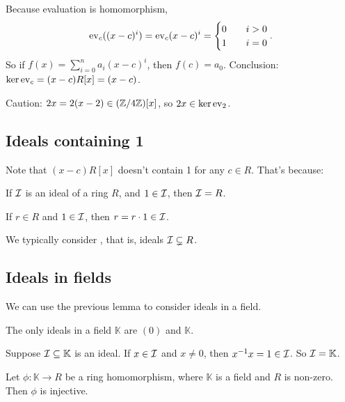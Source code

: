 \documentclass[12pt,letterpaper]{report}
\begin{document}
Because evaluation is homomorphism,
\[
  \operatorname{ev}_c((x - c)^i) = \operatorname{ev}_c(x - c)^i = \begin{cases}
    0 \quad & i > 0 \\
    1 & i = 0
  \end{cases}.
\]
So if $f(x) = \sum_{i = 0}^n a_i (x - c)^i$, then $f(c) = a_0$.
Conclusion: $\ker\operatorname{ev}_c = (x - c)R[x] = (x - c)$.

Caution: $2x = 2(x - 2) \in (\mathbb{Z}/{4}\mathbb{Z})[x]$, so $2x \in \ker\operatorname{ev}_2$.

\pagebreak
\subsection{Ideals containing 1}

Note that $(x - c)R[x]$ doesn't contain 1 for any $c \in R$.
That's because:

\begin{lem}{}{}
  If $\mathcal{I}$ is an ideal of a ring $R$, and $1 \in \mathcal{I}$, then $\mathcal{I} = R$.
\end{lem}

\begin{thmproof}
  If $r \in R$ and $1 \in \mathcal{I}$, then $r = r \cdot 1 \in \mathcal{I}$.
\end{thmproof}

We typically consider , that is, ideals $\mathcal{I} \subsetneq R$.

\pagebreak
\subsection{Ideals in fields}

We can use the previous lemma to consider ideals in a field.

\begin{cor}{}{}
  The only ideals in a field $\mathbb{K}$ are $(0)$ and $\mathbb{K}$.
\end{cor}

\begin{thmproof}
  Suppose $\mathcal{I} \subseteq \mathbb{K}$ is an ideal.
  If $x \in \mathcal{I}$ and $x \neq 0$, then $x^{-1}x = 1 \in \mathcal{I}$.
  So $\mathcal{I} = \mathbb{K}$.
\end{thmproof}

\begin{cor}{}{}
  Let $\phi \colon \mathbb{K} \to R$ be a ring homomorphism, where $\mathbb{K}$ is a field and $R$
  is non-zero.
  Then $\phi$ is injective.
\end{cor}
\end{document}
